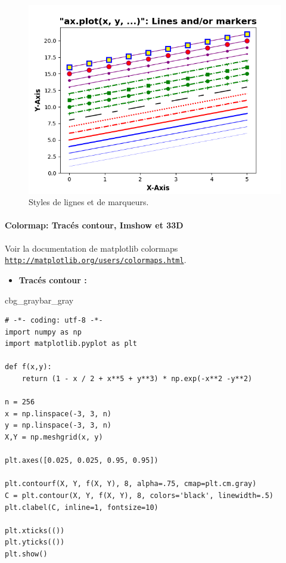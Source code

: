 \documentclass[%
oneside,                 %
final,                   %
10pt,french]{article}
\newenvironment{_pro_tight}[2]{
   \def\FrameCommand{\color{#2}\vrule width 1mm\normalcolor\colorbox{#1}}
   \FrameRule0.6pt\MakeFramed {\advance\hsize-2mm\FrameRestore}\vskip3mm}
   {\vskip0mm\endMakeFramed}
\newenvironment{pro}[2]{
\bgroup\rmfamily
\fboxsep=0mm\relax
\begin{_pro_tight}{#1}{#2}
\list{}{\parsep=-2mm\parskip=0mm\topsep=0pt\leftmargin=2mm
\rightmargin=2\leftmargin\leftmargin=4pt\relax}
\item\relax}
{\endlist\end{_pro_tight}\egroup}
\begin{document}
\begin{figure}[!ht]  %
  \centerline{\includegraphics[width=0.7\linewidth]{imgs/LineandMarkerStyles.png}}
  \caption{
  Styles de lignes et de marqueurs. \label{fig:LineandMarkerStyles}
  }
\end{figure}


\paragraph{Colormap: Tracés contour, Imshow et 33D}


Voir la documentation de matplotlib colormaps \href{{http://matplotlib.org/users/colormaps.html}}{\nolinkurl{http://matplotlib.org/users/colormaps.html}}.

\begin{itemize}
 \item \textbf{Tracés contour :}
\end{itemize}

\noindent
\begin{pro}{cbg_gray}{bar_gray}\begin{verbatim}
# -*- coding: utf-8 -*-
import numpy as np
import matplotlib.pyplot as plt

def f(x,y):
    return (1 - x / 2 + x**5 + y**3) * np.exp(-x**2 -y**2)

n = 256
x = np.linspace(-3, 3, n)
y = np.linspace(-3, 3, n)
X,Y = np.meshgrid(x, y)

plt.axes([0.025, 0.025, 0.95, 0.95])

plt.contourf(X, Y, f(X, Y), 8, alpha=.75, cmap=plt.cm.gray)
C = plt.contour(X, Y, f(X, Y), 8, colors='black', linewidth=.5)
plt.clabel(C, inline=1, fontsize=10)

plt.xticks(())
plt.yticks(())
plt.show()
\end{verbatim}
\end{pro}
\noindent
\end{document}
